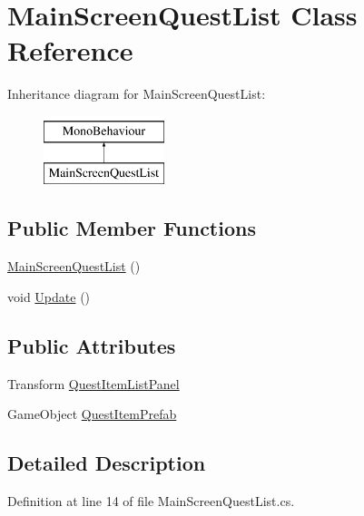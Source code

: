 \hypertarget{class_main_screen_quest_list}{}\section{Main\+Screen\+Quest\+List Class Reference}
\label{class_main_screen_quest_list}
Inheritance diagram for Main\+Screen\+Quest\+List\+:\begin{figure}[H]
\begin{center}
\leavevmode
\includegraphics[height=2.000000cm]{class_main_screen_quest_list}
\end{center}
\end{figure}
\subsection*{Public Member Functions}
\begin{DoxyCompactItemize}
\item 
\hyperlink{class_main_screen_quest_list_a3a1a90761c2038db556c47dcd564c93c}{Main\+Screen\+Quest\+List} ()
\item 
void \hyperlink{class_main_screen_quest_list_a83e841d0b0575f1e00f9a2dbd1d36e65}{Update} ()
\end{DoxyCompactItemize}
\subsection*{Public Attributes}
\begin{DoxyCompactItemize}
\item 
Transform \hyperlink{class_main_screen_quest_list_af0bafc44a4fd53d655090c343648fb59}{Quest\+Item\+List\+Panel}
\item 
Game\+Object \hyperlink{class_main_screen_quest_list_ae1064238395f280fd4293ec57df7fbc8}{Quest\+Item\+Prefab}
\end{DoxyCompactItemize}


\subsection{Detailed Description}


Definition at line 14 of file Main\+Screen\+Quest\+List.\+cs.



